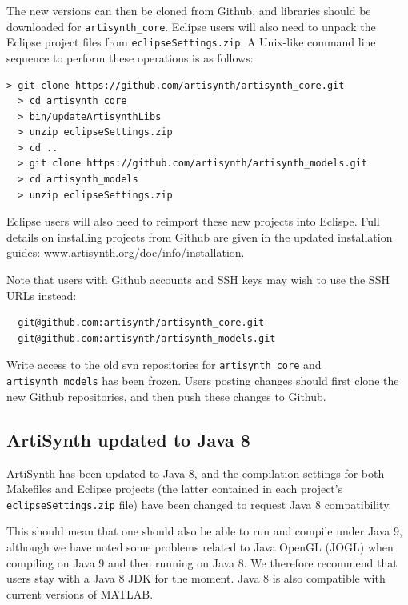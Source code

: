 \documentclass{article}
\begin{document}
The new versions can then be cloned from Github, and libraries should
be downloaded for {\tt artisynth\_core}. Eclipse users will also need
to unpack the Eclipse project files from {\tt eclipseSettings.zip}.
A Unix-like command line sequence to perform these operations
is as follows:
%
\begin{lstlisting}[]
  > git clone https://github.com/artisynth/artisynth_core.git 
  > cd artisynth_core
  > bin/updateArtisynthLibs
  > unzip eclipseSettings.zip
  > cd ..
  > git clone https://github.com/artisynth/artisynth_models.git 
  > cd artisynth_models
  > unzip eclipseSettings.zip
\end{lstlisting}
%
Eclipse users will also need to reimport these new projects into
Eclispe. Full details on installing projects from Github are given in
the updated installation guides:
\href{http://www.artisynth.org/doc/info/installation}%
{www.artisynth.org/doc/info/installation}.

\begin{sideblock}
Note that users with Github accounts and SSH keys may wish to use the
SSH URLs instead:
%
\begin{verbatim}
  git@github.com:artisynth/artisynth_core.git
  git@github.com:artisynth/artisynth_models.git
\end{verbatim}
%
\end{sideblock}

\begin{sideblock}
Write access to the old svn repositories for {\tt artisynth\_core} and
{\tt artisynth\_models} has been frozen. Users posting changes should
first clone the new Github repositories, and then push these changes
to Github.
\end{sideblock}

\subsection*{ArtiSynth updated to Java 8}

ArtiSynth has been updated to Java 8, and the compilation settings for
both Makefiles and Eclipse projects (the latter contained in each
project's {\tt eclipseSettings.zip} file) have been changed to request
Java 8 compatibility. 

This should mean that one should also be able to run and compile under
Java 9, although we have noted some problems related to Java OpenGL
(JOGL) when compiling on Java 9 and then running on Java 8.  We
therefore recommend that users stay with a Java 8 JDK for the
moment. Java 8 is also compatible with current versions of MATLAB.
\end{document}
